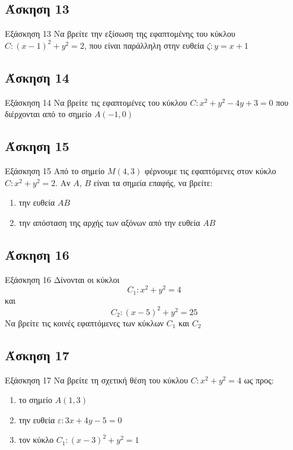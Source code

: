 \documentclass[greek]{beamer}
\begin{document}
\subsection{Άσκηση 13}
\begin{frame}[label=Άσκηση13,t]{Εξάσκηση 13}
 Να βρείτε την εξίσωση της εφαπτομένης του κύκλου $C:(x-1)^2+y^2=2$, που είναι παράλληλη στην ευθεία $ζ:y=x+1$

\end{frame}

\subsection{Άσκηση 14}
\begin{frame}[label=Άσκηση14,t]{Εξάσκηση 14}
 Να βρείτε τις εφαπτομένες του κύκλου $C:x^2+y^2-4y+3=0$ που διέρχονται από το σημείο $Α(-1,0)$

\end{frame}

\subsection{Άσκηση 15}
\begin{frame}[label=Άσκηση15,t]{Εξάσκηση 15}
 Από το σημείο $Μ(4,3)$ φέρνουμε τις εφαπτόμενες στον κύκλο $C:x^2+y^2=2$. Αν $Α$, $Β$ είναι τα σημεία επαφής, να βρείτε:
 \begin{enumerate}
  \item<1-> την ευθεία $ΑΒ$
  \item<2-> την απόσταση της αρχής των αξόνων από την ευθεία $ΑΒ$
 \end{enumerate}

\end{frame}

\subsection{Άσκηση 16}
\begin{frame}[label=Άσκηση16,t]{Εξάσκηση 16}
  Δίνονται οι κύκλοι
  $$C_1:x^2+y^2=4$$
  και
  $$C_2:(x-5)^2+y^2=25$$
  Να βρείτε τις κοινές εφαπτόμενες των κύκλων $C_1$ και $C_2$

\end{frame}

\subsection{Άσκηση 17}
\begin{frame}[label=Άσκηση17,t]{Εξάσκηση 17}
  Να βρείτε τη σχετική θέση του κύκλου $C:x^2+y^2=4$ ως προς:
  \begin{enumerate}
    \item<1-> το σημείο $Α(1,3)$
    \item<2-> την ευθεία $ε:3x+4y-5=0$
    \item<3-> τον κύκλο $C_1:(x-3)^2+y^2=1$
  \end{enumerate}

\end{frame}
\end{document}
